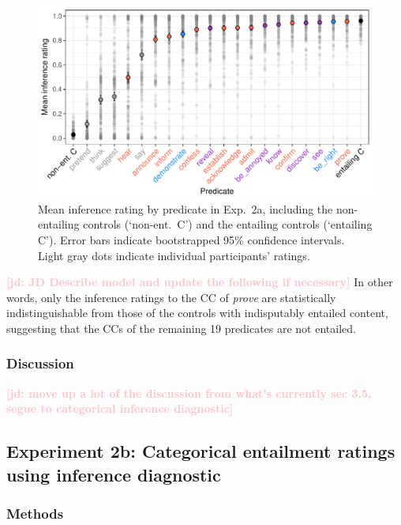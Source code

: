 \documentclass[11pt,fleqn]{article}
\newcommand{\jd}[1]{\textbf{\textcolor{Pink}{[jd: #1]}}}
\newcommand{\6}{\mbox{$[\hspace*{-.6mm}[$}}
\newcommand{\9}{\mbox{$]\hspace*{-.6mm}]$}}
\begin{document}
\begin{figure}[h!]
\centering

\includegraphics[width=.7\paperwidth]{../../results/4-veridicality3/graphs/means-inference-by-predicate-variability}

\caption{Mean inference rating by predicate in Exp.~2a, including the non-entailing controls (`non-ent.\ C') and the entailing controls (`entailing C'). Error bars indicate bootstrapped 95\% confidence intervals. Light gray dots indicate individual participants' ratings.} %
\label{f-veridicality-predicate}
\end{figure}

\jd{JD Describe model and update the following if necessary} In other words, only the inference ratings to the CC of {\em prove} are statistically indistinguishable from those of the controls with indisputably entailed content, suggesting that the CCs of the remaining 19 predicates are not entailed.

\subsubsection{Discussion}

\jd{move up a lot of the discussion from what's currently sec 3.5, segue to categorical inference diagnostic}

\subsection{Experiment 2b: Categorical entailment ratings using inference diagnostic}

\subsubsection{Methods}
\end{document}
